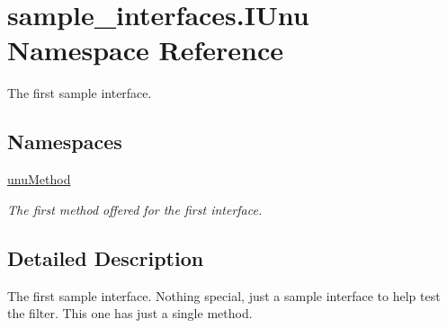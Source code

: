 \hypertarget{namespacesample__interfaces_1_1_i_unu}{\section{sample\-\_\-interfaces.\-I\-Unu Namespace Reference}
\label{namespacesample__interfaces_1_1_i_unu}
}


The first sample interface.  


\subsection*{Namespaces}
\begin{DoxyCompactItemize}
\item 
\hyperlink{namespacesample__interfaces_1_1_i_unu_1_1unu_method}{unu\-Method}
\begin{DoxyCompactList}\small\item\em The first method offered for the first interface. \end{DoxyCompactList}\end{DoxyCompactItemize}


\subsection{Detailed Description}
The first sample interface. Nothing special, just a sample interface to help test the filter. This one has just a single method. 